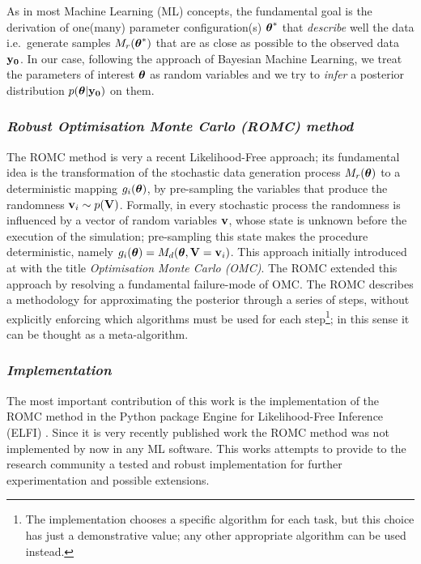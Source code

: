 As in most Machine Learning (ML) concepts, the fundamental goal is the
derivation of one(many) parameter configuration(s) $\boldsymbol{\theta}^*$ that
\textit{describe} well the data i.e.\ generate samples
$M_r(\boldsymbol{\theta}^*)$ that are as close as possible to the observed data
$\mathbf{y_0}$. In our case, following the approach of Bayesian Machine
Learning, we treat the parameters of interest $\boldsymbol{\theta}$ as random
variables and we try to \textit{infer} a posterior distribution
$p(\boldsymbol{\theta}|\mathbf{y_0})$ on them. 

\subsubsection*{\textit{Robust Optimisation Monte Carlo (ROMC) method}}

The ROMC method \autocite{Ikonomov2019} is very a recent Likelihood-Free
approach; its fundamental idea is the transformation of the stochastic
data generation process $M_r(\boldsymbol{\theta})$ to a deterministic mapping
$g_i(\boldsymbol{\theta})$, by pre-sampling the variables that produce the randomness
$\mathbf{v}_i \sim p(\mathbf{V})$. Formally, in every stochastic process the randomness
is influenced by a vector of random variables $\mathbf{v}$, whose state is
unknown before the execution of the simulation; pre-sampling this
state makes the procedure deterministic, namely
$g_i(\boldsymbol{\theta}) = M_d(\boldsymbol{\theta}, \mathbf{V}=\mathbf{v}_i)$. This approach initially introduced
at \autocite{Meeds2015} with the title \textit{Optimisation Monte
Carlo (OMC)}. The ROMC extended this approach by resolving a
fundamental failure-mode of OMC. The ROMC describes a methodology for
approximating the posterior through a series of steps, without
explicitly enforcing which algorithms must be used for each
step\footnote{The implementation chooses a specific algorithm for each
  task, but this choice has just a demonstrative value; any other
  appropriate algorithm can be used instead.}; in this sense it can be
thought as a meta-algorithm.

\subsubsection*{\textit{Implementation}}

The most important contribution of this work is the implementation of
the ROMC method in the Python package Engine for Likelihood-Free
Inference (ELFI) \autocite{1708.00707}. Since it is very recently
published work the ROMC method was not implemented by now in any ML
software. This works attempts to provide to the research community a
tested and robust implementation for further experimentation and
possible extensions.
